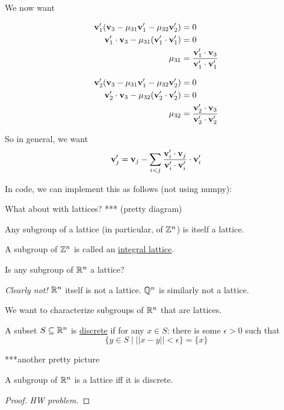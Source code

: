 We now want
\begin{minipage}[t]{.45\textwidth}
    \begin{align*}
        \mathbf{v}_1'(\mathbf{v}_3 - \mu_{31}\mathbf{v}_1' - \mu_{32}\mathbf{v}_2')  & = 0                                                                \\
        \mathbf{v}_1'\cdot \mathbf{v}_3 - \mu_{31}(\mathbf{v}_1'\cdot \mathbf{v}_1') & = 0                                                                \\
        \mu_{31}                                                             & = \frac{\mathbf{v}_1'\cdot \mathbf{v}_3}{\mathbf{v}_1'\cdot \mathbf{v}_1'}
    \end{align*}
\end{minipage}%
\begin{minipage}[t]{.45\textwidth}
    \begin{align*}
        \mathbf{v}_2'(\mathbf{v}_3 - \mu_{31}\mathbf{v}_1' - \mu_{32}\mathbf{v}_2')  & = 0                                                                \\
        \mathbf{v}_2'\cdot \mathbf{v}_3 - \mu_{32}(\mathbf{v}_2'\cdot \mathbf{v}_2') & = 0                                                                \\
        \mu_{32}                                                             & = \frac{\mathbf{v}_2'\cdot \mathbf{v}_3}{\mathbf{v}_2'\cdot \mathbf{v}_2'}
    \end{align*}
\end{minipage}

So in general, we want
\[\mathbf{v}_j' = \mathbf{v}_j - \sum_{i < j}\frac{\mathbf{v}_i'\cdot \mathbf{v}_j}{\mathbf{v}_i'\cdot \mathbf{v}_i'}\cdot \mathbf{v}_i'\]

In code, we can implement this as follows (not using \textsf{numpy}):


What about with lattices?
*** (pretty diagram)

Any subgroup of a lattice (in particular, of $\mathbb Z^n$) is itself a lattice.

\begin{definition}
    A subgroup of $\mathbb Z^n$ is called an \ul{integral lattice}.
\end{definition}
\begin{ques*}
    Is any subgroup of $\mathbb R^n$ a lattice?
\end{ques*}
\emph{Clearly not!} $\mathbb R^n$ itself is not a lattice. $\mathbb Q^n$ is similarly not a lattice.

We want to characterize subgroups of $\mathbb R^n$ that are lattices.
\begin{definition}
    A subset $S\subseteq \mathbb R^n$ is \ul{discrete} if for any $x\in S$: there is some $\epsilon > 0$ such that
    \[\{y\in S\mid ||x - y|| < \epsilon\} = \{x\}\]
\end{definition}
***another pretty picture

\begin{theorem}
    A subgroup of $\mathbb R^n$ is a lattice iff it is discrete.
\end{theorem}
\begin{proof}
    \emph{HW problem.}
\end{proof}